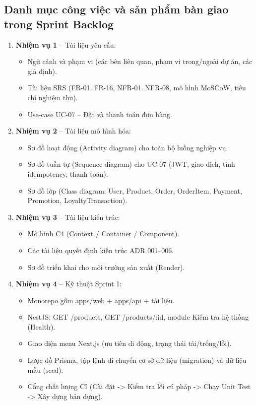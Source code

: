 \documentclass[12pt, a4paper]{article}
\begin{document}
\subsection{Danh mục công việc và sản phẩm bàn giao trong Sprint Backlog}
\begin{enumerate}
  \item \textbf{Nhiệm vụ 1} -- Tài liệu yêu cầu:
  \begin{itemize}
    \item Ngữ cảnh và phạm vi (các bên liên quan, phạm vi trong/ngoài dự án, các giả định).
    \item Tài liệu SRS (FR-01..FR-16, NFR-01..NFR-08, mô hình MoSCoW, tiêu chí nghiệm thu).
    \item Use-case UC-07 -- Đặt và thanh toán đơn hàng.
  \end{itemize}
  \item \textbf{Nhiệm vụ 2} -- Tài liệu mô hình hóa:
  \begin{itemize}
    \item Sơ đồ hoạt động (Activity diagram) cho toàn bộ luồng nghiệp vụ.
    \item Sơ đồ tuần tự (Sequence diagram) cho UC-07 (JWT, giao dịch, tính idempotency, thanh toán).
    \item Sơ đồ lớp (Class diagram: User, Product, Order, OrderItem, Payment, Promotion, LoyaltyTransaction).
  \end{itemize}
  \item \textbf{Nhiệm vụ 3} -- Tài liệu kiến trúc:
  \begin{itemize}
    \item Mô hình C4 (Context / Container / Component).
    \item Các tài liệu quyết định kiến trúc ADR 001--006.
    \item Sơ đồ triển khai cho môi trường sản xuất (Render).
  \end{itemize}
  \item \textbf{Nhiệm vụ 4} -- Kỹ thuật Sprint 1:
  \begin{itemize}
    \item Monorepo gồm apps/web + apps/api + tài liệu.
    \item NestJS: GET /products, GET /products/:id, module Kiểm tra hệ thống (Health).
    \item Giao diện menu Next.js (ưu tiên di động, trạng thái tải/trống/lỗi).
    \item Lược đồ Prisma, tập lệnh di chuyển cơ sở dữ liệu (migration) và dữ liệu mẫu (seed).
    \item Cổng chất lượng CI (Cài đặt -> Kiểm tra lỗi cú pháp -> Chạy Unit Test -> Xây dựng bản dựng).
  \end{itemize}
\end{enumerate}
\end{document}
